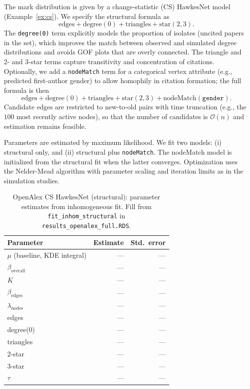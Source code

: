 \documentclass[12pt]{article}
\begin{document}
The mark distribution is given by a change-statistic (CS) HawkesNet model (Example~\ref{ex:cs}). We specify the structural formula as
\[
\text{edges} + \text{degree}(0) + \text{triangles} + \text{star}(2{,}3).
\]
The \texttt{degree(0)} term explicitly models the proportion of isolates (uncited papers in the set), which improves the match between observed and simulated degree distributions and avoids GOF plots that are overly connected. The triangle and 2- and 3-star terms capture transitivity and concentration of citations. Optionally, we add a \texttt{nodeMatch} term for a categorical vertex attribute (e.g., predicted first-author gender) to allow homophily in citation formation; the full formula is then
\[
\text{edges} + \text{degree}(0) + \text{triangles} + \text{star}(2{,}3) + \text{nodeMatch}(\texttt{gender}).
\]
Candidate edges are restricted to new-to-old pairs with time truncation (e.g., the $100$ most recently active nodes), so that the number of candidates is $\mathcal{O}(n)$ and estimation remains feasible.

Parameters are estimated by maximum likelihood. We fit two models: (i) structural only, and (ii) structural plus \texttt{nodeMatch}. The nodeMatch model is initialized from the structural fit when the latter converges. Optimization uses the Nelder-Mead algorithm with parameter scaling and iteration limits as in the simulation studies.

\begin{table}[htbp]
\centering
\caption{OpenAlex CS HawkesNet (structural): parameter estimates from inhomogeneous fit. Fill from \texttt{fit\_inhom\_structural} in \texttt{results\_openalex\_full.RDS}.}
\label{tab:openalex_structural}
\begin{tabular}{lrr}
\toprule
Parameter & Estimate & Std.\ error \\
\midrule
$\mu$ (baseline, KDE integral) & --- & --- \\
$\beta_{\text{overall}}$ & --- & --- \\
$K$ & --- & --- \\
$\beta_{\text{edges}}$ & --- & --- \\
$\lambda_{\text{nodes}}$ & --- & --- \\
edges & --- & --- \\
degree(0) & --- & --- \\
triangles & --- & --- \\
2-star & --- & --- \\
3-star & --- & --- \\
$\tau$ & --- & --- \\
\bottomrule
\end{tabular}
\end{table}
\end{document}
